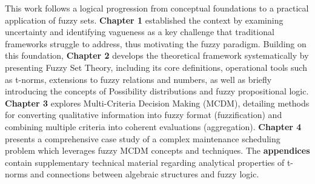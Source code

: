 This work follows a logical progression from conceptual foundations to a practical application of fuzzy sets. \textbf{Chapter 1} established the context by examining uncertainty and identifying vagueness as a key challenge that traditional frameworks struggle to address, thus motivating the fuzzy paradigm. Building on this foundation, \textbf{Chapter 2} develops the theoretical framework systematically by presenting Fuzzy Set Theory, including its core definitions, operational tools such as t-norms, extensions to fuzzy relations and numbers, as well as briefly introducing the concepts of Possibility distributions and fuzzy propositional logic. \textbf{Chapter 3} explores Multi-Criteria Decision Making (MCDM), detailing methods for converting qualitative information into fuzzy format (fuzzification) and combining multiple criteria into coherent evaluations (aggregation). \textbf{Chapter 4} presents a comprehensive case study of a complex maintenance scheduling problem which leverages fuzzy MCDM concepts and techniques. The \textbf{appendices} contain supplementary technical material regarding analytical properties of t-norms and connections between algebraic structures and fuzzy logic.





